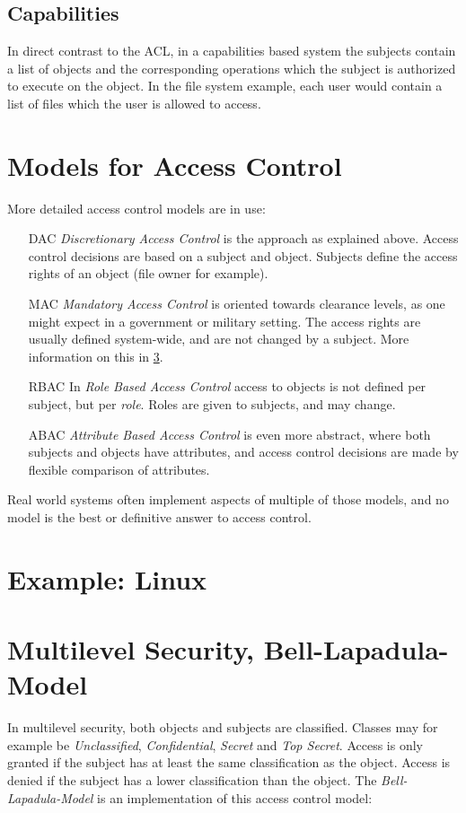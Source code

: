 \subsection{Capabilities}
In direct contrast to the ACL, in a capabilities based system the subjects
contain a list of objects and the corresponding operations which the subject is
authorized to execute on the object. In the file system example, each user would
contain a list of files which the user is allowed to access.

\section{Models for Access Control}
More detailed access control models are in use:
\begin{itemize}
    \item[DAC] \emph{Discretionary Access Control} is the approach as explained
          above. Access control decisions are based on a subject and object.
          Subjects define the access rights of an object (file owner for
          example).
    \item[MAC] \emph{Mandatory Access Control} is oriented towards clearance
          levels, as one might expect in a government or military setting. The
          access rights are usually defined system-wide, and are not changed by
          a subject. More information on this in \cref{sec:belllapadula}.
    \item[RBAC] In \emph{Role Based Access Control} access to objects is not
          defined per subject, but per \textit{role}. Roles are given to
          subjects, and may change.
    \item[ABAC] \emph{Attribute Based Access Control} is even more abstract,
          where both subjects and objects have attributes, and access control
          decisions are made by flexible comparison of attributes.
\end{itemize}

Real world systems often implement aspects of multiple of those models, and no
model is the best or definitive answer to access control.

\section{Example: Linux}

\section{Multilevel Security, Bell-Lapadula-Model}
\label{sec:belllapadula}
In multilevel security, both objects and subjects are classified. Classes may
for example be \textit{Unclassified}, \textit{Confidential}, \textit{Secret} and
\textit{Top Secret}. Access is only granted if the subject has at least the same
classification as the object. Access is denied if the subject has a lower
classification than the object. The \emph{Bell-Lapadula-Model} is an
implementation of this access control model:

